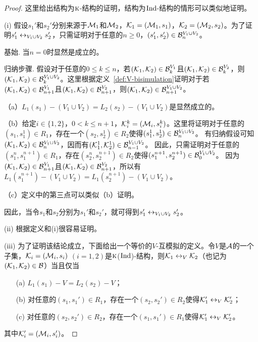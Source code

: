 \begin{proof}
	这里给出结构为$\textsc{k}$-结构的证明，结构为$\textrm{Ind}$-结构的情形可以类似地证明。
	
	(i) 假设$s_1'$和$s_2'$分别来源于${\cal M}_1$和${\cal M}_2$，${\cal K}_1=({\cal M}_1,s_1)$，${\cal K}_2=({\cal M}_2,s_2)$。为了证明$s_1'\leftrightarrow_{V_1 \cup V_2} s_2'$，只需证明对于任意的$n\ge 0$，$(s_1',s_2')\in {\cal B}_n^{V_1 \cup V_2}$。
	
	基始. 当$n=0$时显然是成立的。
	
	归纳步骤. 假设对于任意的$0\leq k \leq n$，若$({\cal K}_1, {\cal K}_2) \in {\cal B}_k^{V_1}$且$({\cal K}_1, {\cal K}_2) \in {\cal B}_k^{V_2}$，则$({\cal K}_1, {\cal K}_2) \in {\cal B}_k^{V_1\cup V_2}$。这里根据定义~\ref{def:V-bisimulation}证明对于若$({\cal K}_1, {\cal K}_2) \in {\cal B}_{n+1}^{V_1}$且$({\cal K}_1, {\cal K}_2) \in {\cal B}_{n+1}^{V_2}$，则$({\cal K}_1, {\cal K}_2) \in {\cal B}_{n+1}^{V_1\cup V_2}$。
	
	（a）$L_1(s_1)-(V_1\cup V_2) = L_2(s_2) - (V_1 \cup V_2)$是显然成立的。
	
	（b）给定$i\in \{1,2\}$，$0< k \leq n+1$，${\cal K}_i^k=({\cal M}_i, s_i^k)$。这里将证明对于任意的$(s_1,s_1^1)\in R_1$，存在一个$(s_2,s_2^1)\in R_2$使得$(s_1^1,s_2^1)\in {\cal B}_n^{V_1\cup V_2}$。
	有归纳假设可知$({\cal K}_1,{\cal K}_2)\in {\cal B}_n^{V_1\cup V_2}$，因而有$({\cal K}_1^1, {\cal K}_2^1) \in {\cal B}_{n-1}^{V_1 \cup V_2}$。
	因此，只需证明对于任意的$(s_1^n,s_1^{n+1})\in R_1$，存在$(s_2^n,s_2^{n+1}) \in R_2$使得$(s_1^{n+1},s_2^{n+1})\in {\cal B}_0^{V_1\cup V_2}$。
	因为$({\cal K}_1,{\cal K}_2)\in {\cal B}_{n+1}^{V_1}$且$({\cal K}_1,{\cal K}_2)\in {\cal B}_{n+1}^{V_2}$，所以有$L_1(s_1^{n+1}) - (V_1 \cup V_2) = L_1(s_2^{n+1}) - (V_1 \cup V_2)$。
	
	（c）定义中的第三点可以类似（b）证明。
	
	因此，当令$s_1$和$s_2$分别为$s_1'$和$s_2'$，就可得到$s_1'\leftrightarrow_{V_1 \cup V_2} s_2'$。
	
	(ii) 根据定义和(i)很容易证明。
	
	(iii) 为了证明该结论成立，下面给出一个等价的$V$-互模拟的定义。令$V$是${\cal A}$的一个子集，${\cal K}_i=({\cal M}_i, s_i)$ $(i=1,2)$是$\textsc{k}$($\textrm{Ind}$)-结构，则${\cal K}_1\leftrightarrow_V {\cal K}_2$（也记为$({\cal K}_1,{\cal K}_2) \in {\cal B}$）当且仅当
	\begin{itemize}
		\item[(a)] $L_1(s_1)-V = L_2(s_2)-V$；
		\item[(b)] 对任意的$(s_1,s_1')\in R_1$，存在一个$(s_2,s_2')\in R_2$使得${\cal K}_1' \leftrightarrow_V {\cal K}_2'$；
		\item[(c)] 对任意的$(s_2,s_2')\in R_2$，存在一个$(s_1,s_1')\in R_1$使得${\cal K}_1' \leftrightarrow_V {\cal K}_2'$。
	\end{itemize}
	其中${\cal K}_i'=({\cal M}_i, s_i')$。


\end{proof}
